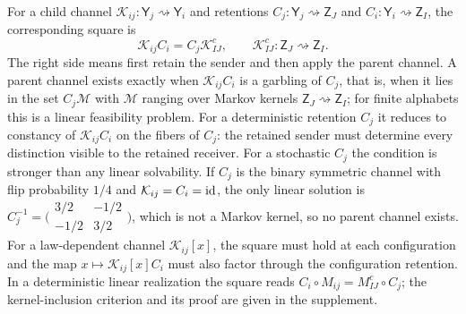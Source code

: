 For a child channel $\mathcal K_{ij}:\mathsf Y_j\rightsquigarrow\mathsf Y_i$
and retentions $C_j:\mathsf Y_j\rightsquigarrow\mathsf Z_J$ and
$C_i:\mathsf Y_i\rightsquigarrow\mathsf Z_I$, the corresponding square is
\begin{equation}
 \mathcal K_{ij}C_i=C_j\mathcal K_{IJ}^c,
 \qquad \mathcal K_{IJ}^c:\mathsf Z_J\rightsquigarrow\mathsf Z_I.
 \label{inh:channel-square}
\end{equation}
The right side means first retain the sender and then apply the parent
channel. A parent channel exists exactly when $\mathcal K_{ij}C_i$ is a
garbling of $C_j$, that is, when it lies in the set $C_j\mathcal M$ with
$\mathcal M$ ranging over Markov kernels $\mathsf Z_J\rightsquigarrow\mathsf Z_I$;
for finite alphabets this is a linear feasibility problem. For a
deterministic retention $C_j$ it reduces to constancy of
$\mathcal K_{ij}C_i$ on the fibers of $C_j$: the retained sender must
determine every distinction visible to the retained receiver. For a
stochastic $C_j$ the condition is stronger than any linear solvability. If
$C_j$ is the binary symmetric channel with flip probability $1/4$ and
$\mathcal K_{ij}=C_i=\mathrm{id}$, the only linear solution is
$C_j^{-1}=\bigl(\begin{smallmatrix}3/2&-1/2\\-1/2&3/2\end{smallmatrix}\bigr)$,
which is not a Markov kernel, so no parent channel exists. For a
law-dependent channel $\mathcal K_{ij}[x]$, the square must hold at each
configuration and the map $x\mapsto\mathcal K_{ij}[x]C_i$ must also factor
through the configuration retention. In a deterministic linear realization
the square reads $C_i\circ M_{ij}=M_{IJ}^c\circ C_j$; the kernel-inclusion
criterion and its proof are given in the supplement.

